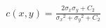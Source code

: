 \documentclass[preview]{standalone}
\begin{document}
\begin{align*}
c(x,y) = \frac{2\sigma_x\sigma_y + C_2}{{\sigma_x}^2 + {\sigma_y}^2 + C_2}
\end{align*}
\end{document}
